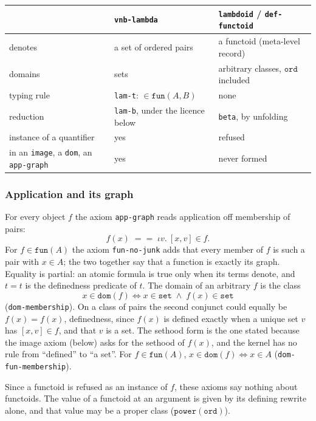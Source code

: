 \begin{center}
\begin{tabular}{lll}
\hline
 & \texttt{vnb-lambda} & \texttt{lambdoid} / \texttt{def-functoid} \\
\hline
denotes & a set of ordered pairs & a functoid (meta-level record) \\
domains & sets & arbitrary classes, $\mathtt{ord}$ included \\
typing rule & \texttt{lam-t}: $\in \mathtt{fun}(A, B)$ & none \\
reduction & \texttt{lam-b}, under the licence below & \texttt{beta}, by unfolding \\
instance of a quantifier & yes & refused \\
in an \texttt{image}, a \texttt{dom}, an \texttt{app-graph} & yes & never formed \\
\hline
\end{tabular}
\end{center}

\subsubsection{Application and its graph}

For every object $f$ the axiom \texttt{app-graph} reads application off
membership of pairs:
\[
  f(x) \;==\; \iota v.\ [x, v] \in f .
\]
For $f \in \mathtt{fun}(A)$ the axiom \texttt{fun-no-junk} adds that every
member of $f$ is such a pair with $x \in A$; the two together say that a
function is exactly its graph.  Equality is partial: an atomic formula is
true only when its terms denote, and $t = t$ is the definedness predicate
of $t$.  The domain of an arbitrary $f$ is the class
\[
  x \in \mathtt{dom}(f) \iff x \in \mathtt{set} \;\wedge\; f(x) \in \mathtt{set}
\]
(\texttt{dom-membership}).  On a class of pairs the second conjunct
could equally be $f(x) = f(x)$, definedness, since $f(x)$ is defined
exactly when a unique set $v$ has $[x, v] \in f$, and that $v$ is a set.
The sethood form is the one stated because the image axiom (below) asks
for the sethood of $f(x)$, and the kernel has no rule from ``defined'' to
``a set''.  For $f \in \mathtt{fun}(A)$,
$x \in \mathtt{dom}(f) \iff x \in A$ (\texttt{dom-fun-membership}).

Since a functoid is refused as an instance of $f$, these axioms say nothing
about functoids.  The value of a functoid at an argument is given by its
defining rewrite alone, and that value may be a proper class
($\texttt{power}(\mathtt{ord})$).

